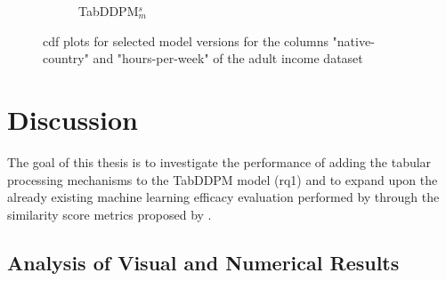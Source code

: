 \begin{figure}[H]
\begin{subfigure}{0.23\textwidth}
		\caption{TabDDPM$^{s}_m$}
	\end{subfigure}
	\caption[CDF plots]{\gls{cdf} plots for selected model versions for the columns "native-country" and "hours-per-week" of the adult income dataset \cite{Dua:2019}}
	\label{fig:cdf}
\end{figure}

\newpage
\section{Discussion}
\label{ch:results-discussion}
The goal of this thesis is to investigate the performance of adding the tabular processing mechanisms to the TabDDPM model (\gls{rq}1) and
to expand upon the already existing machine learning efficacy evaluation performed by \cite{kotelnikov2022TabDDPMModellingTabular} through the similarity score metrics proposed by \cite{chundawat2022UniversalMetricRobust}.

\subsection*{Analysis of Visual and Numerical Results}

